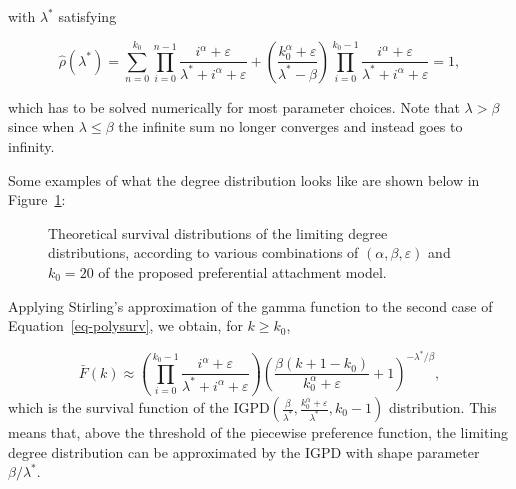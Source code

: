 \documentclass[
  sn-basic,
]{sn-jnl}
\theoremstyle{plain}
\theoremstyle{remark}
\begin{document}
with \(\lambda^*\) satisfying

\[
\hat\rho(\lambda^{*}) = \sum_{n=0}^{k_0}\prod_{i=0}^{n-1}\frac{i^\alpha + \varepsilon}{\lambda^{*}+i^\alpha + \varepsilon} + \left(\frac{k_0^\alpha + \varepsilon}{\lambda^{*}-\beta}\right)\prod_{i=0}^{k_0-1}\frac{i^\alpha + \varepsilon}{\lambda^{*} + i^\alpha + \varepsilon} = 1,
\]

which has to be solved numerically for most parameter choices. Note that
\(\lambda>\beta\) since when \(\lambda\le \beta\) the infinite sum no
longer converges and instead goes to infinity.

Some examples of what the degree distribution looks like are shown below
in Figure~\ref{fig-polylinsurv}:

\begin{figure}[H]


\caption{\label{fig-polylinsurv}Theoretical survival distributions of
the limiting degree distributions, according to various combinations of
\((\alpha, \beta, \varepsilon)\) and \(k_0=20\) of the proposed
preferential attachment model.}

\end{figure}%

Applying Stirling's approximation of the gamma function to the second
case of Equation~\ref{eq-polysurv}, we obtain, for \(k\geq k_0\),

\[
\bar F(k) 
\displaystyle\approx \left(\prod_{i=0}^{k_0-1}\frac{i^\alpha + \varepsilon}{\lambda^*+i^\alpha + \varepsilon}\right) \left(\frac{\beta(k+1-k_0)}{k_0^{\alpha}+\varepsilon} + 1\right)^{-\lambda^*/\beta},%
\] which is the survival function of the
\(\text{IGPD}\left(\frac{\beta}{\lambda^*}, \frac{k_0^\alpha + \varepsilon}{\lambda^*},k_0-1\right)\)
distribution. This means that, above the threshold of the piecewise
preference function, the limiting degree distribution can be
approximated by the IGPD with shape parameter \(\beta/\lambda^{*}\).
\end{document}
